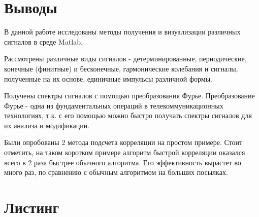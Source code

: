 \section{Выводы}

В данной работе исследованы методы получения и визуализации различных сигналов в среде Matlab. 

Рассмотрены различные виды сигналов - детерминированные, периодические, конечные (финитные) и бесконечные, гармонические колебания и сигналы, полученные на их основе, единичные импульсы различной формы.

Получены спектры сигналов с помощью преобразования Фурье. Преобразование Фурье - одна из фундаментальных операций в телекоммуникационных технологиях, т.к. с его помощью можно быстро получать спектры сигналов для их анализа и модификации. 

Были опробованы 2 метода подсчета корреляции на простом примере. Стоит отметить,  на таком коротком примере алгоритм быстрой корреляции оказался всего в 2 раза быстрее обычного алгоритма. Его эффективность вырастет во много раз, по сравнению с 
обычным алгоритмом на больших посылках.
\newpage
\section{Листинг}


\parindent=1cm


\parindent=1cm


\parindent=1cm


\parindent=1cm


\parindent=1cm


\parindent=1cm


\parindent=1cm


\parindent=1cm


\parindent=1cm

